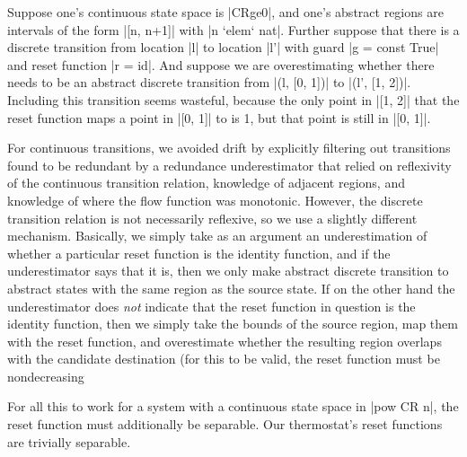 \documentclass[runningheads]{llncs}
\begin{document}
{Suppose one's continuous state space is |CRge0|, and one's abstract regions are intervals of the form |[n, n+1]| with |n `elem` nat|. Further suppose that there is a discrete transition from location |l| to location |l'| with guard |g = const True| and reset function |r = id|. And suppose we are overestimating whether there needs to be an abstract discrete transition from |(l, [0, 1])| to |(l', [1, 2])|. Including this transition seems wasteful, because the only point in |[1, 2]| that the reset function maps a point in |[0, 1]| to is 1, but that point is still in |[0, 1]|.

For continuous transitions, we avoided drift by explicitly filtering out transitions found to be redundant by a redundance underestimator that relied on reflexivity of the continuous transition relation, knowledge of adjacent regions, and knowledge of where the flow function was monotonic. However, the discrete transition relation is not necessarily reflexive, so we use a slightly different mechanism. Basically, we simply take as an argument an underestimation of whether a particular reset function is the identity function, and if the underestimator says that it is, then we only make abstract discrete transition to abstract states with the same region as the source state. If on the other hand the underestimator does \emph{not} indicate that the reset function in question is the identity function, then we simply take the bounds of the source region, map them with the reset function, and overestimate whether the resulting region overlaps with the candidate destination (for this to be valid, the reset function must be nondecreasing


For all this to work for a system with a continuous state space in |pow CR n|, the reset function must additionally be separable. Our thermostat's reset functions are trivially separable.

}
\end{document}
